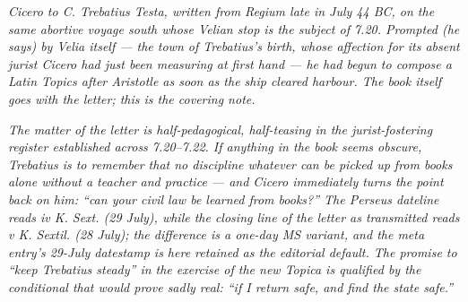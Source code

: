 
\textit{Cicero to C. Trebatius Testa, written from Regium late in
July 44 BC, on the same abortive voyage south whose Velian stop is
the subject of 7.20. Prompted (he says) by Velia itself --- the town
of Trebatius's birth, whose affection for its absent jurist Cicero
had just been measuring at first hand --- he had begun to compose a
Latin \textit{Topics} after Aristotle as soon as the ship cleared
harbour. The book itself goes with the letter; this is the covering
note.}

\textit{The matter of the letter is half-pedagogical, half-teasing
in the jurist-fostering register established across 7.20--7.22.
If anything in the book seems obscure, Trebatius is to remember
that no discipline whatever can be picked up from books alone without
a teacher and practice --- and Cicero immediately turns the point
back on him: ``can your civil law be learned from books?'' The
Perseus dateline reads \textit{iv K. Sext.} (29 July), while the
closing line of the letter as transmitted reads \textit{v K.
Sextil.} (28 July); the difference is a one-day MS variant, and the
meta entry's 29-July datestamp is here retained as the editorial
default. The promise to ``keep Trebatius steady'' in the exercise
of the new \textit{Topica} is qualified by the conditional that
would prove sadly real: ``if I return safe, and find the state
safe.''}
